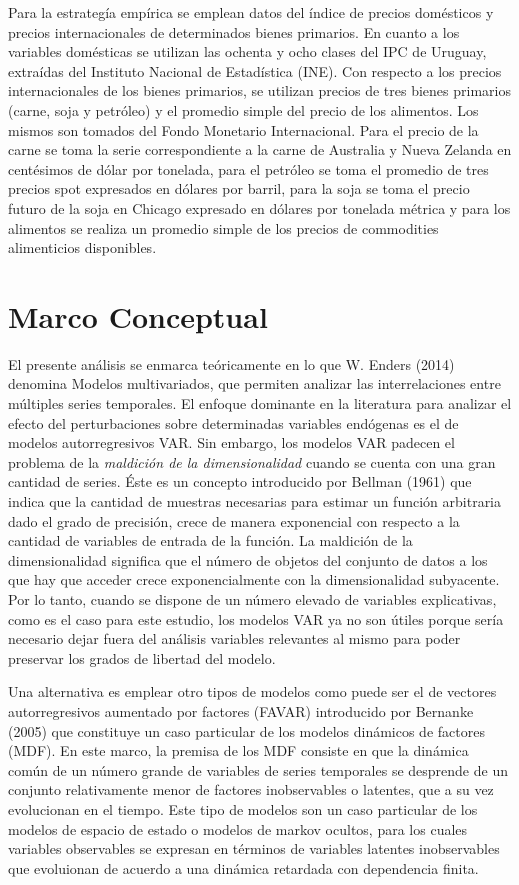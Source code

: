 \documentclass[a4paper,twoside,15pt]{article}
\begin{document}
Para la estrategía empírica se emplean datos del índice de precios domésticos y precios internacionales de determinados bienes primarios. En cuanto a los variables domésticas se utilizan las ochenta y ocho clases del IPC de Uruguay, extraídas del Instituto Nacional de Estadística (INE).  Con respecto a los precios internacionales de los bienes primarios, se utilizan precios de tres bienes primarios (carne, soja y petróleo) y el promedio simple del precio de los alimentos. Los mismos son tomados del Fondo Monetario Internacional. Para el precio de la carne se toma la serie correspondiente a la carne de Australia y Nueva Zelanda en centésimos de dólar por tonelada, para el petróleo se toma el promedio de tres precios spot expresados en dólares por barril, para la soja
se toma el precio futuro de la soja en Chicago expresado en dólares por tonelada
métrica  y para los alimentos se realiza un promedio simple de los precios de commodities alimenticios disponibles. 

\newpage


\section*{Marco Conceptual}


El presente análisis se enmarca teóricamente en lo que W. Enders (2014) denomina Modelos multivariados, que permiten analizar las interrelaciones entre múltiples series temporales. El enfoque dominante en la literatura para analizar el efecto del perturbaciones sobre determinadas variables endógenas es el de modelos autorregresivos VAR. Sin embargo, los modelos VAR padecen el problema de la \textit{maldición de la dimensionalidad} cuando se cuenta con una gran cantidad de series. Éste es un concepto introducido por Bellman (1961) que indica que la cantidad de muestras necesarias para estimar un función arbitraria dado el grado de precisión, crece de manera exponencial con respecto a la cantidad de variables de entrada de la función. La maldición de la dimensionalidad significa que el número de objetos del conjunto de datos a los que hay que acceder crece exponencialmente con la dimensionalidad subyacente.
Por lo tanto, cuando se dispone de un número elevado de variables explicativas, como es el caso para este estudio, los modelos VAR ya no son útiles porque sería necesario dejar fuera del análisis variables relevantes al mismo para poder preservar los grados de libertad del modelo.

Una alternativa es emplear otro tipos de modelos como puede ser el de vectores autorregresivos aumentado por factores (FAVAR) introducido por Bernanke (2005) que constituye un caso particular de los modelos dinámicos de factores (MDF). En este marco, la premisa de los MDF consiste en que la dinámica común de un número grande de variables de series temporales se desprende de un conjunto relativamente menor de factores inobservables o latentes, que a su vez evolucionan en el tiempo. Este tipo de modelos son un caso particular de los modelos de espacio de estado o modelos de markov ocultos, para los cuales variables observables se expresan en términos de variables latentes inobservables que evoluionan de acuerdo a una dinámica retardada con dependencia finita. 
\end{document}
